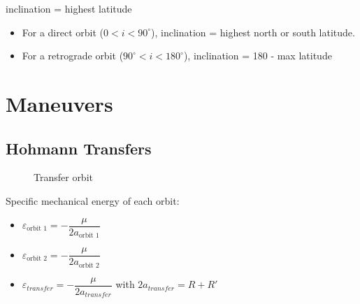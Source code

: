 \documentclass{article}
\begin{document}
inclination = highest latitude

\begin{itemize}
	\item For a direct orbit ($0 < i < 90^\circ$), inclination = highest north or south latitude.
	\item For a retrograde orbit ($90^\circ < i < 180^\circ$), inclination = 180 - max latitude
\end{itemize}

\section{Maneuvers}
\subsection{Hohmann Transfers}

\begin{figure}[!h]
	\centering
	\caption{Transfer orbit}
	\label{fig:coordinate_system}
\end{figure}

Specific mechanical energy of each orbit:

\begin{itemize}
	\item $\varepsilon_{\text{orbit 1}} = -\dfrac{\mu}{2a_{\text{orbit 1}}}$
	\item $\varepsilon_{\text{orbit 2}} = -\dfrac{\mu}{2a_{\text{orbit 2}}}$
	\item $\varepsilon_{transfer} = -\dfrac{\mu}{2a_{transfer}}$ with $2a_{transfer} = R + R'$
\end{itemize}
\end{document}
